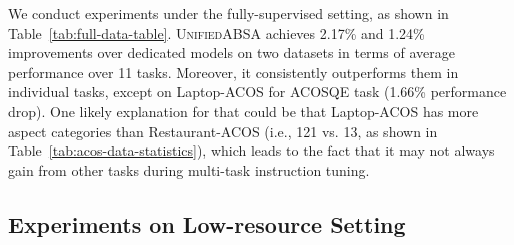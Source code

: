 \documentclass[11pt]{article}
\newcommand{\UnifiedABSA}{\textsc{UnifiedABSA}\xspace}
\begin{document}
We conduct experiments under the fully-supervised setting, as shown in  Table~\ref{tab:full-data-table}. \UnifiedABSA achieves 2.17\% and 1.24\% improvements over dedicated models on two datasets in terms of average performance over 11 tasks. Moreover, it consistently outperforms them in individual tasks, except on Laptop-ACOS for ACOSQE task (1.66\% performance drop). One likely explanation for that could be that Laptop-ACOS has more aspect categories than Restaurant-ACOS (i.e., 121 vs. 13, as shown in Table~\ref{tab:acos-data-statistics}), which leads to the fact that it may not always gain from other tasks during multi-task instruction tuning.



\subsection{Experiments on Low-resource Setting}
\label{sec:low-resource-exp}
\end{document}
